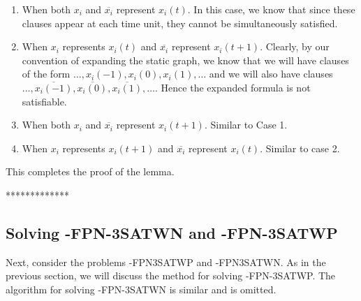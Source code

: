 \begin{enumerate}
\item
When both $x_i$ and $\overline{x_i}$ represent $x_i(t)$. In this case,
we know that since these clauses appear at each time unit, they cannot be
simultaneously satisfied.

\item
When $x_i$ represents $x_i(t)$ and $\overline{x_i}$ represent $x_i(t+1)$.
 Clearly, by our convention of expanding
the static graph, we know that we will have clauses of the form
$\ldots, x_i(-1), x_i(0), x_i(1), \ldots$ and we will also have clauses
$\ldots, \overline{x_i(-1)}, \overline{x_i(0)}, \overline{x_i(1)}, \ldots$.
Hence the expanded formula is not satisfiable.

\item
When both $x_i$ and $\overline{x_i}$ represent $x_i(t+1)$. Similar to Case 1.

\item
When $x_i$ represents $x_i(t+1)$ and 
$\overline{x_i}$ represent $x_i(t)$.  Similar to case 2.
\end{enumerate}
This completes the proof of the lemma.\QED

*************
\fi





\subsection{Solving {-FPN-3SATWN} and  {-FPN-3SATWP}}
Next, consider the problems {-FPN3SATWP} and {-FPN3SATWN}. 
As in the previous section, we will discuss the method for solving 
{-FPN-3SATWP}. The algorithm for solving {-FPN-3SATWN} is 
similar and is omitted.


\iffalse
The algorithm for solving {\sf 1-FPN-3SATWP} 
is little more subtler then solving an
instance of {\sf 1-PN-3SATWP}. To see this observe that  in case
of {\sf 1-PN-3SATWP}, whenever we have a clause of the form $x_i(t)$ or
$x_i(t+1)$, we have that all the copies of the variable $x_i$ are set to
true (A  similar argument applies for negated clauses). But in the
case of finite instances while a clause of  the form $x_i(t)$  implies that
$x_i$ is set to true for time periods, it is not necessarily true if there
is a clause of the form $x_i(t+1)$. Such a clause does not say anything 
about the value that has to be assigned to the variable $x_i(0)$. In fact, the 
following example shows that the only way the expanded formula is satisfied
is to assign different values to the copy of a particular variable.
\fi



